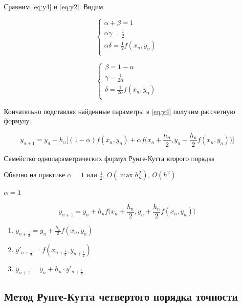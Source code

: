 Сравним \ref{eq:y4} и \ref{eq:y2}. Видим

\begin{equation*}
    \begin{cases}
        \alpha + \beta = 1 \\
        \alpha \gamma = \frac{1}{2} \\
        \alpha \delta = \frac{1}{2} f(x_n, y_n) \\
    \end{cases}
\end{equation*}

\begin{equation*}
    \begin{cases}
        \beta = 1 - \alpha \\
        \gamma = \frac{1}{2\alpha} \\
        \delta = \frac{1}{2\alpha} f(x_n, y_n) \\
    \end{cases}
\end{equation*}

Кончательно подставляя найденные параметры в \ref{eq:y4} получим
рассчетную формулу.

\begin{equation}
    y_{n+1} = y_n + h_n
    \bigg[ (1-\alpha) f(x_n, y_n) + \alpha f \big( x_n + \frac{h_n}{2},
    y_n + \frac{h_n}{2} f(x_n, y_n) \big) \bigg]
\end{equation}

Семейство однопараметрических формул Рунге-Кутта второго порядка

Обычно на практике $\alpha = 1$ или $\frac{1}{2}$, $O(\max h_n^2)$,
$O(h^2)$

\underline{$\alpha = 1$}

\begin{equation*}
    y_{n+1} = y_n + h_n
    f\big(x_n + \frac{h_n}{2}, y_n + \frac{h_n}{2} f(x_n, y_n)\big)
\end{equation*}

\begin{enumerate}
    \item $y_{n + \frac{1}{2}} = y_n + \frac{h_n}{2}f(x_n, y_n)$
    \item $y'_{n+\frac{1}{2}} = f(x_{n + \frac{1}{2}}, y_{n + \frac{1}{2}})$
    \item $y_{n+1} = y_n + h_n \cdot y'_{n + \frac{1}{2}}$
\end{enumerate}

\subsection{Метод Рунге-Кутта четвертого порядка точности}

